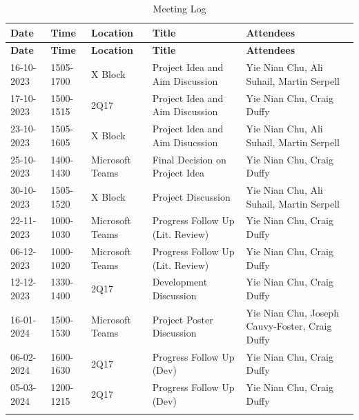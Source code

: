 \newpage
\begin{landscape}
\setcounter{figure}{0}
\setcounter{table}{0} 
\begin{longtable}{ |m{2.5cm}|m{2.5cm}|m{2cm}|m{6.5cm}|m{8cm}| }
    \hline
    \rowcolor{lightgray}
    \textbf{Date} & \textbf{Time} & \textbf{Location} & \textbf{Title} & \textbf{Attendees} \\
    \hline
    \endfirsthead

    \hline
    \rowcolor{lightgray}
    \textbf{Date} & \textbf{Time} & \textbf{Location} & \textbf{Title} & \textbf{Attendees} \\
    \hline
    \endhead
    16-10-2023 & 1505-1700 & X Block & Project Idea and Aim Discussion & Yie Nian Chu, Ali Suhail, Martin Serpell \\
    \hline
    17-10-2023 & 1500-1515 & 2Q17 & Project Idea and Aim Discussion & Yie Nian Chu, Craig Duffy \\
    \hline
    23-10-2023 & 1505-1605 & X Block & Project Idea and Aim Disucssion & Yie Nian Chu, Ali Suhail, Martin Serpell \\
    \hline
    25-10-2023 & 1400-1430 & Microsoft Teams & Final Decision on Project Idea & Yie Nian Chu, Craig Duffy \\
    \hline
    30-10-2023 & 1505-1520 & X Block & Project Discussion & Yie Nian Chu, Ali Suhail, Martin Serpell \\
    \hline
    22-11-2023 & 1000-1030 & Microsoft Teams & Progress Follow Up (Lit. Review) & Yie Nian Chu, Craig Duffy \\
    \hline
    06-12-2023 & 1000-1020 & Microsoft Teams & Progress Follow Up (Lit. Review) & Yie Nian Chu, Craig Duffy \\
    \hline
    12-12-2023 & 1330-1400 & 2Q17 & Development Discussion & Yie Nian Chu, Craig Duffy \\
    \hline
    16-01-2024 & 1500-1530 & Microsoft Teams & Project Poster Discussion & Yie Nian Chu, Joseph Cauvy-Foster, Craig Duffy \\
    \hline
    06-02-2024 & 1600-1630 & 2Q17 & Progress Follow Up (Dev) & Yie Nian Chu, Craig Duffy \\
    \hline
    05-03-2024 & 1200-1215 & 2Q17 & Progress Follow Up (Dev) & Yie Nian Chu, Craig Duffy \\
    \hline
    \caption{Meeting Log}
    \label{tab:meeting-log}
\end{longtable}
\end{landscape}